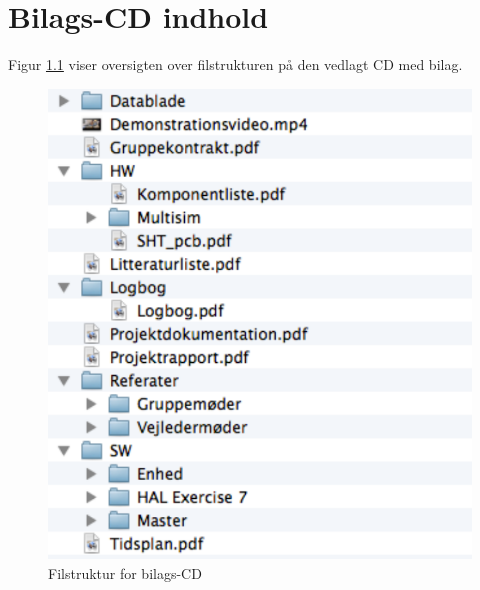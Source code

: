 \chapter{Bilags-CD indhold}

Figur \ref{fig:Bilags_CD} viser oversigten over filstrukturen på den vedlagt CD med bilag.

\begin{figure}[H]
  \centering
    \includegraphics[height=0.6\textheight]{billeder/cd-bilag}
    \caption{Filstruktur for bilags-CD}
    \label{fig:Bilags_CD}
\end{figure}